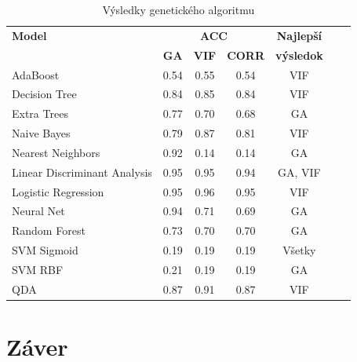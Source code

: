 \documentclass[runningheads]{llncs}
\begin{document}
\begin{table}[]
    \centering
    \caption{Výsledky genetického algoritmu}\label{tab_nastavenie_vyhodnotenie_experimentu}
    \begin{tabular}{|l|c|c|c|c|c|c|}   
    \hline
    \textbf{Model}               & \multicolumn{3}{c|}{\textbf{ACC}}                       & \textbf{ Najlepší  } \\ 
                                 & \textbf{GA} & \textbf{VIF} & \textbf{CORR}& \textbf{výsledok}  \\ \hline
    AdaBoost                     & 0.54        & 0.55         & 0.54       & VIF   \\ \hline
    Decision Tree                & 0.84        & 0.85         & 0.84       & VIF     \\ \hline
    Extra Trees                  & 0.77        & 0.70         & 0.68       & GA       \\ \hline
    Naive Bayes                  & 0.79        & 0.87         & 0.81       & VIF        \\ \hline
    Nearest Neighbors            & 0.92        & 0.14         & 0.14       & GA            \\ \hline
    Linear Discriminant Analysis & 0.95        & 0.95         & 0.94       & GA, VIF              \\ \hline
    Logistic Regression          & 0.95        & 0.96         & 0.95       & VIF         \\ \hline
    Neural Net                   & 0.94        & 0.71         & 0.69       & GA           \\ \hline
    Random Forest                & 0.73        & 0.70         & 0.70       & GA              \\ \hline
    SVM Sigmoid                  & 0.19        & 0.19         & 0.19       & Všetky         \\ \hline
    SVM RBF                      & 0.21        & 0.19         & 0.19       & GA           \\ \hline
    QDA                          & 0.87        & 0.91         & 0.87       & VIF           \\ \hline
    \end{tabular}
\end{table}

\section{Záver}
\end{document}
